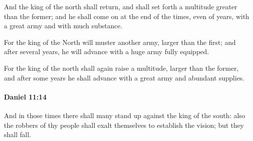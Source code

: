 			\begin{versebox}
					\item[BHS] 
					\item[LXX] 
					\item[ASV] And the king of the north shall return, and shall set forth a multitude greater than the former; and he shall come on at the end of the times, even of years, with a great army and with much substance.
					\item[NIV] For the king of the North will muster another army, larger than the first; and after several years, he will advance with a huge army fully equipped.
					\item[NRSV] For the king of the north shall again raise a multitude, larger than the former, and after some years he shall advance with a great army and abundant supplies.
			\end{versebox}

		\paragraph{Daniel 11:14} %
			\label{DANIEL-11-14}

			And in those times there shall many stand up against the king of the south: also the robbers of thy people shall exalt themselves to establish the vision; but they shall fall.

